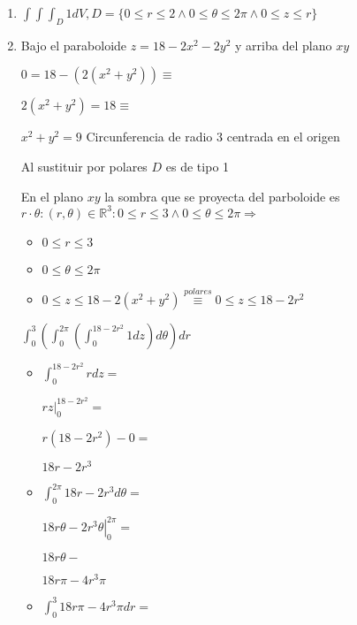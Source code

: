 \documentclass[../practica_09.tex]{subfiles}
\begin{document}
    \begin{enumerate}
        \item $ \int\int\int_D 1 dV, D=\{0\leq r \leq 2 \wedge 0 \leq \theta \leq 2\pi \wedge 0 \leq z \leq r \} $
        
        \item Bajo el paraboloide $z=18-2x^2-2y^2$ y arriba del plano $xy$

            $ 0 = 18 - (2(x^2 + y^2)) \equiv $

            $ 2(x^2+y^2) = 18 \equiv $

            $ x^2 + y^2 = 9 $ Circunferencia de radio 3 centrada en el origen

            Al sustituir por polares $D$ es de tipo 1

            En el plano $xy$ la sombra que se proyecta del parboloide es $ r\cdot \theta : (r,\theta) \in \mathbb{R}^3: 0 \leq r \leq 3 \wedge 0 \leq \theta \leq 2\pi \Rightarrow$

            \begin{itemize}
                \item $ 0 \leq r \leq 3 $
                \item $ 0 \leq \theta \leq 2\pi$
                \item $ 0 \leq z \leq 18 - 2(x^2+y^2) \stackrel{polares}{\equiv} 0 \leq z \leq 18 - 2r^2 $
            \end{itemize}

            $ \int_0^3 (\int_0^{2\pi} (\int_0^{18-2r^2} 1 dz) d\theta) dr $

            \begin{itemize}
                \item $ \int_0^{18-2r^2} r dz = $

                    $ \left. rz \right |_0^{18-2r^2} = $

                    $ r(18-2r^2) - 0 = $

                    $ 18r-2r^3 $

                \item $ \int_0^{2\pi} 18r-2r^3 d\theta = $

                    $\left. 18r\theta - 2r^3\theta \right |_0^{2\pi} = $

                    $ 18r\theta -  $

                    $ 18r\pi-4r^3\pi $

                \item $ \int_0^3 18r\pi-4r^3\pi dr = $


\end{itemize}
\end{enumerate}
\end{document}
